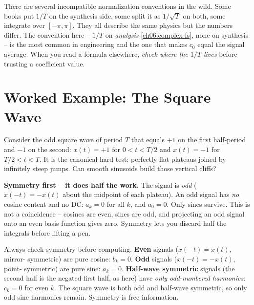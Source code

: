 \begin{trapbox}
There are several incompatible normalization conventions in the wild. Some books put
\(1/T\) on the synthesis side, some split it as \(1/\sqrt{T}\) on both, some integrate
over \([-\pi,\pi]\). They all describe the same physics but the numbers differ. The
convention here -- \(1/T\) on \emph{analysis} \eqref{ch06:complex-fs}, none on synthesis --
is the most common in engineering and the one that makes \(c_0\) equal the signal average.
When you read a formula elsewhere, \emph{check where the \(1/T\) lives} before trusting a
coefficient value.
\end{trapbox}

\section{Worked Example: The Square Wave}

Consider the odd square wave of period \(T\) that equals
\(+1\) on the first half-period and \(-1\) on the second:
\(x(t) = +1\) for \(0 < t < T/2\) and \(x(t) = -1\) for \(T/2 < t < T\). It is the
canonical hard test: perfectly flat plateaus joined by infinitely steep jumps. Can smooth
sinusoids build those vertical cliffs?

\textbf{Symmetry first -- it does half the work.} The signal is \emph{odd} (\(x(-t) =
-x(t)\) about the midpoint of each plateau). An odd signal has \emph{no} cosine content and
no DC: \(a_k = 0\) for all \(k\), and \(a_0 = 0\). Only sines survive. This is not a
coincidence -- cosines are even, sines are odd, and projecting an odd signal onto an even
basis function gives zero. Symmetry lets you discard half the integrals before lifting a
pen.

\begin{intuitionbox}
Always check symmetry before computing. \textbf{Even} signals (\(x(-t)=x(t)\), mirror-
symmetric) are pure cosine: \(b_k=0\). \textbf{Odd} signals (\(x(-t)=-x(t)\), point-
symmetric) are pure sine: \(a_k=0\). \textbf{Half-wave symmetric} signals (the second half
is the negated first half, as here) have \emph{only odd-numbered harmonics}: \(c_k=0\) for
even \(k\). The square wave is both odd and half-wave symmetric, so only odd sine harmonics
remain. Symmetry is free information.
\end{intuitionbox}


